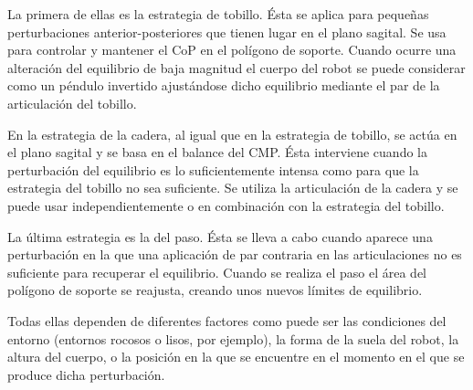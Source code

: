La primera de ellas es la estrategia de tobillo. Ésta se aplica para pequeñas perturbaciones anterior-posteriores que tienen lugar en el plano sagital. Se usa para controlar y mantener el CoP en el polígono de soporte. Cuando ocurre una alteración del equilibrio de baja magnitud el cuerpo del robot se puede considerar como un péndulo invertido ajustándose dicho equilibrio mediante el par de la articulación del tobillo. 

En la estrategia de la cadera, al igual que en la estrategia de tobillo, se actúa en el plano sagital y se basa en el balance del CMP. Ésta interviene cuando la perturbación del equilibrio es lo suficientemente intensa como para que la estrategia del tobillo no sea suficiente. Se utiliza la articulación de la cadera y se puede usar independientemente o en combinación con la estrategia del tobillo.

La última estrategia es la del paso. Ésta se lleva a cabo cuando aparece una perturbación en la que una aplicación de par contraria en las articulaciones no es suficiente para recuperar el equilibrio. Cuando se realiza el paso el área del polígono de soporte se reajusta, creando unos nuevos límites de equilibrio.

Todas ellas dependen de diferentes factores como puede ser las condiciones del entorno (entornos rocosos o lisos, por ejemplo), la forma de la suela del robot, la altura del cuerpo, o la posición en la que se encuentre en el momento en el que se produce dicha perturbación.


\afterpage{\null\newpage}
\newpage